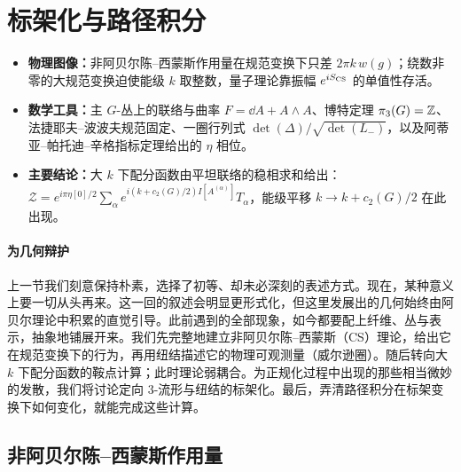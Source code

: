 
\section{标架化与路径积分}\label{sec:3}

\begin{keytakeaways}
\begin{itemize}[leftmargin=1.4em,itemsep=2pt,topsep=2pt]
  \item \textbf{物理图像：}非阿贝尔陈--西蒙斯作用量在规范变换下只差 $2\pi k\,w(g)$；绕数非零的大规范变换迫使能级 $k$ 取整数，量子理论靠振幅 $e^{iS_{\mathrm{CS}}}$ 的单值性存活。
  \item \textbf{数学工具：}主 $G$-丛上的联络与曲率 $F=\dd A+A\wedge A$、博特定理 $\pi_3(G)=\mathbb{Z}$、法捷耶夫--波波夫规范固定、一圈行列式 $\det(\Delta)/\sqrt{\det(L_-)}$，以及阿蒂亚--帕托迪--辛格指标定理给出的 $\eta$ 相位。
  \item \textbf{主要结论：}大 $k$ 下配分函数由平坦联络的稳相求和给出：$\mathcal{Z}=e^{i\pi\eta[0]/2}\sum_\alpha e^{i(k+c_2(G)/2)I[A^{(\alpha)}]}T_\alpha$，能级平移 $k\to k+c_2(G)/2$ 在此出现。
\end{itemize}
\end{keytakeaways}

\paragraph{为几何辩护}
上一节我们刻意保持朴素，选择了初等、却未必深刻的表述方式。现在，某种意义上要一切从头再来。这一回的叙述会明显更形式化，但这里发展出的几何始终由阿贝尔理论中积累的直觉引导。此前遇到的全部现象，如今都要配上纤维、丛与表示，抽象地铺展开来。我们先完整地建立非阿贝尔陈--西蒙斯（CS）理论，给出它在规范变换下的行为，再用纽结描述它的物理可观测量（威尔逊圈）。随后转向大 $k$ 下配分函数的鞍点计算；此时理论弱耦合。为正规化过程中出现的那些相当微妙的发散，我们将讨论定向 3-流形与纽结的标架化。最后，弄清路径积分在标架变换下如何变化，就能完成这些计算。

\subsection{非阿贝尔陈--西蒙斯作用量}\label{sec:3.1}

